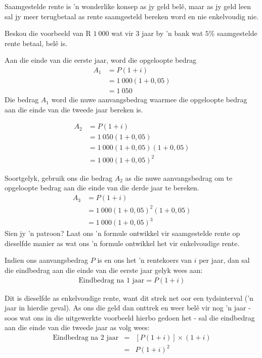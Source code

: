 Saamgestelde rente is 'n wonderlike konsep as jy geld bel\^e, maar as jy geld leen sal jy meer terugbetaal as rente saamgesteld bereken word en nie enkelvoudig nie.



Beskou die voorbeeld van R $1~000$ wat vir $3$ jaar by 'n bank wat $5\%$ saamgestelde rente betaal, belê is.

Aan die einde van die eerste jaar, word die opgeloopte bedrag
\begin{align*}
  A_1 &= P(1 + i)\\
  &= 1~000(1+0,05)\\
  &=1~050
\end{align*}
Die bedrag $A_1$ word die nuwe aanvangsbedrag waarmee die opgeloopte bedrag aan die einde van die tweede jaar bereken is. 

\begin{align*}
    A_2 &= P(1 + i)\\
&= 1~050(1+0,05)\\
&=1~000(1+0,05)(1+0,05)\\
&= 1~000(1+0,05)^2
\end{align*}

Soortgelyk, gebruik ons die bedrag $A_2$ as die nuwe aanvangsbedrag om te opgeloopte bedrag aan die einde van die derde jaar te bereken.
\begin{align*}
    A_3 &= P(1 + i)\\
&=1~000(1+0,05)^2(1+0,05)\\
&= 1~000(1+0,05)^3
\end{align*}
Sien jy 'n patroon? Laat ons ’n formule ontwikkel vir saamgestelde rente op dieselfde manier as wat ons ’n formule ontwikkel het vir
enkelvoudige rente.\par

Indien ons aanvangsbedrag $P$ is en ons het ’n rentekoers van $i$ per jaar, dan sal die eindbedrag aan die einde
van die eerste jaar gelyk wees aan:
\begin{eqnarray*}
    \mbox{Eindbedrag na 1 jaar} = P(1 + i)
\end{eqnarray*}

Dit is dieselfde as enkelvoudige rente, want dit strek net oor een tydsinterval (’n jaar in hierdie geval). As ons die
geld dan onttrek en weer belê vir nog ’n jaar - soos wat ons in die uitgewerkte voorbeeld hierbo gedoen het - sal
die eindbedrag aan die einde van die tweede jaar as volg wees:
\begin{eqnarray*}
    \mbox{Eindbedrag na 2 jaar} &=& [P(1 + i)] \times (1 + i)\\
    &=& P(1 + i)^2
\end{eqnarray*}

